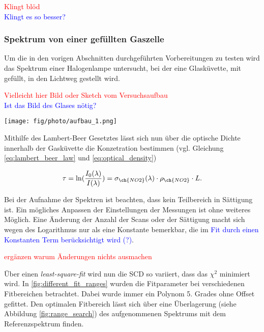\documentclass[12pt, a4paper, bibliography=totoc]{scrartcl}
\begin{document}
\begin{multicols}{2}
\textcolor{red}{Klingt blöd}\\
\textcolor{blue}{Klingt es so besser?} 

\subsubsection{ Spektrum von einer gefüllten Gaszelle}\label{sssec:lab_no2_spectra}

Um die in den vorigen Abschnitten durchgeführten Vorbereitungen zu testen wird das Spektrum einer Halogenlampe untersucht, bei der eine Glasküvette, mit  gefüllt, in den Lichtweg gestellt wird.

\textcolor{red}{Vielleicht hier Bild oder Sketch vom Versuchsaufbau}\\
\textcolor{blue}{Ist das Bild des Glases nötig?}

\begin{center}
    \texttt{[image: fig/photo/aufbau\_1.png]}
    \label{fig:aufbau_hal}
\end{center}


Mithilfe des Lambert-Beer Gesetztes lässt sich nun über die optische Dichte innerhalb der Gasküvette die Konzetration bestimmen (vgl. Gleichung \eqref{eq:lambert_beer_law} und \eqref{eq:optical_density})

\begin{align}
\tau = \ln(\frac{I_0(\lambda)}{I(\lambda)}) = \sigma_{\ch{NO2}}(\lambda) \cdot \rho_{\ch{NO2}} \cdot L.
\end{align}

Bei der Aufnahme der Spektren ist beachten, dass kein Teilbereich in Sättigung ist. 
Ein mögliches Anpassen der Einstellungen der Messungen ist ohne weiteres Möglich. 
Eine Änderung der Anzahl der Scans oder der Sättigung macht sich wegen des Logarithmus nur als eine Konstante bemerkbar, die im \textcolor{blue}{Fit durch einen Konstanten Term berücksichtigt wird (?)}.

\textcolor{red}{ergänzen warum Änderungen nichts ausmachen}

Über einen \textit{least-square-fit} wird nun die SCD so variiert, dass das $\chi^2$ minimiert wird. 
In \ref{fig:different_fit_ranges} wurden die Fitparameter bei verschiedenen Fitbereichen betrachtet. 
Dabei wurde immer ein Polynom 5. Grades ohne Offset gefittet.
Den optimalen Fitbereich lässt sich über eine Überlagerung (siehe Abbildung \ref{fig:range_search}) des aufgenommenen Spektrums mit dem  Referenzspektrum finden.


\end{multicols}
\end{document}
